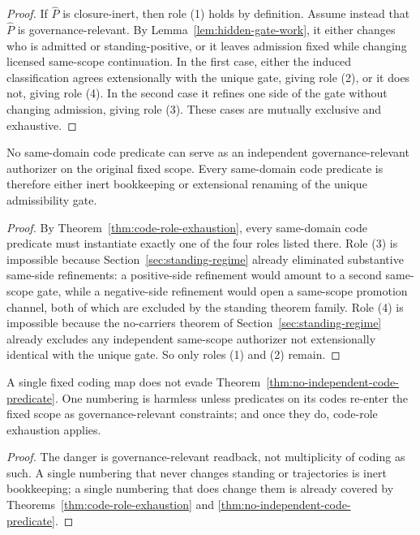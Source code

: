 \begin{proof}
If $\widehat P$ is closure-inert, then role (1) holds by definition. Assume instead that $\widehat P$ is governance-relevant. By Lemma~\ref{lem:hidden-gate-work}, it either changes who is admitted or standing-positive, or it leaves admission fixed while changing licensed same-scope continuation. In the first case, either the induced classification agrees extensionally with the unique gate, giving role (2), or it does not, giving role (4). In the second case it refines one side of the gate without changing admission, giving role (3). These cases are mutually exclusive and exhaustive.
\end{proof}

\begin{theorem}
\label{thm:no-independent-code-predicate}
No same-domain code predicate can serve as an independent governance-relevant authorizer on the original fixed scope. Every same-domain code predicate is therefore either inert bookkeeping or extensional renaming of the unique admissibility gate.
\end{theorem}

\begin{proof}
By Theorem~\ref{thm:code-role-exhaustion}, every same-domain code predicate must instantiate exactly one of the four roles listed there. Role (3) is impossible because Section~\ref{sec:standing-regime} already eliminated substantive same-side refinements: a positive-side refinement would amount to a second same-scope gate, while a negative-side refinement would open a same-scope promotion channel, both of which are excluded by the standing theorem family. Role (4) is impossible because the no-carriers theorem of Section~\ref{sec:standing-regime} already excludes any independent same-scope authorizer not extensionally identical with the unique gate. So only roles (1) and (2) remain.
\end{proof}

\begin{corollary}
A single fixed coding map does not evade Theorem~\ref{thm:no-independent-code-predicate}. One numbering is harmless unless predicates on its codes re-enter the fixed scope as governance-relevant constraints; and once they do, code-role exhaustion applies.
\end{corollary}

\begin{proof}
The danger is governance-relevant readback, not multiplicity of coding as such. A single numbering that never changes standing or trajectories is inert bookkeeping; a single numbering that does change them is already covered by Theorems~\ref{thm:code-role-exhaustion} and \ref{thm:no-independent-code-predicate}.
\end{proof}

